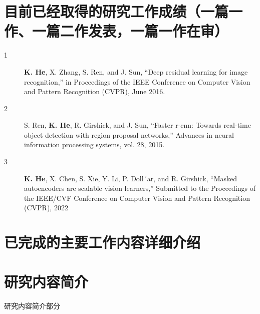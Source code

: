 
\section*{目前已经取得的研究工作成绩（一篇一作、一篇二作发表，一篇一作在审）}
\begin{description}
  \item[1] \textbf{K. He}, X. Zhang, S. Ren, and J. Sun, “Deep residual learning for image recognition,” in Proceedings of the IEEE Conference on Computer Vision and Pattern Recognition (CVPR), June 2016.
  \item[2] S. Ren, \textbf{K. He}, R. Girshick, and J. Sun, “Faster r-cnn: Towards real-time object detection with region proposal networks,” Advances in neural information processing systems,
vol. 28, 2015.
  \item[3] \textbf{K. He}, X. Chen, S. Xie, Y. Li, P. Doll´ar, and R. Girshick, “Masked autoencoders are scalable vision learners,” Submitted to the Proceedings of the IEEE/CVF Conference on Computer Vision and Pattern Recognition (CVPR), 2022
\end{description}

\section*{已完成的主要工作内容详细介绍}

\section{研究内容简介}
研究内容简介部分


%


\normalem %


%
%



